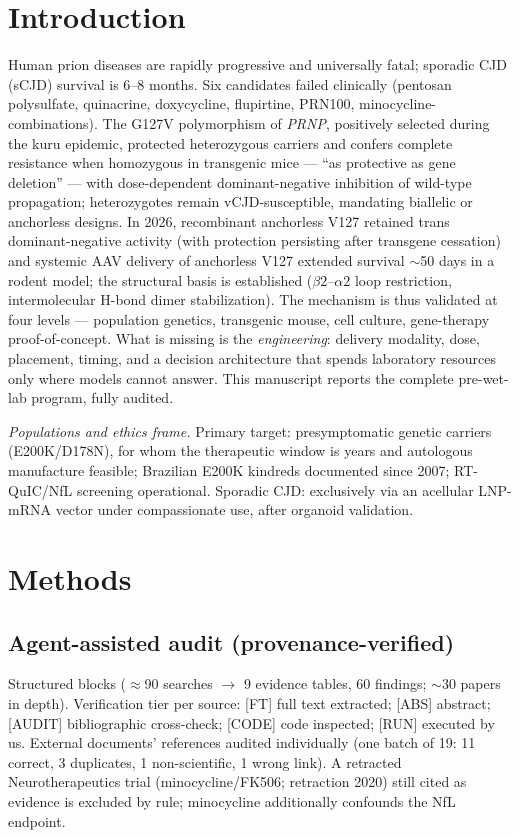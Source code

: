 \documentclass[10pt,twocolumn]{article}
\begin{document}
\section{Introduction}
Human prion diseases are rapidly progressive and universally fatal; sporadic CJD (sCJD) survival is 6--8 months. Six candidates failed clinically (pentosan polysulfate, quinacrine, doxycycline, flupirtine, PRN100, minocycline-combinations). The G127V polymorphism of \emph{PRNP}, positively selected during the kuru epidemic, protected heterozygous carriers and confers complete resistance when homozygous in transgenic mice --- ``as protective as gene deletion'' --- with dose-dependent dominant-negative inhibition of wild-type propagation; heterozygotes remain vCJD-susceptible, mandating biallelic or anchorless designs. In 2026, recombinant anchorless V127 retained trans dominant-negative activity (with protection persisting after transgene cessation) and systemic AAV delivery of anchorless V127 extended survival $\sim$50 days in a rodent model; the structural basis is established ($\beta2$--$\alpha2$ loop restriction, intermolecular H-bond dimer stabilization). The mechanism is thus validated at four levels --- population genetics, transgenic mouse, cell culture, gene-therapy proof-of-concept. What is missing is the \emph{engineering}: delivery modality, dose, placement, timing, and a decision architecture that spends laboratory resources only where models cannot answer. This manuscript reports the complete pre-wet-lab program, fully audited.

\emph{Populations and ethics frame.} Primary target: presymptomatic genetic carriers (E200K/D178N), for whom the therapeutic window is years and autologous manufacture feasible; Brazilian E200K kindreds documented since 2007; RT-QuIC/NfL screening operational. Sporadic CJD: exclusively via an acellular LNP-mRNA vector under compassionate use, after organoid validation.

\section{Methods}
\subsection{Agent-assisted audit (provenance-verified)}
Structured blocks ($\approx$90 searches $\to$ 9 evidence tables, 60 findings; $\sim$30 papers in depth). Verification tier per source: [FT] full text extracted; [ABS] abstract; [AUDIT] bibliographic cross-check; [CODE] code inspected; [RUN] executed by us. External documents' references audited individually (one batch of 19: 11 correct, 3 duplicates, 1 non-scientific, 1 wrong link). A retracted Neurotherapeutics trial (minocycline/FK506; retraction 2020) still cited as evidence is excluded by rule; minocycline additionally confounds the NfL endpoint.
\end{document}
